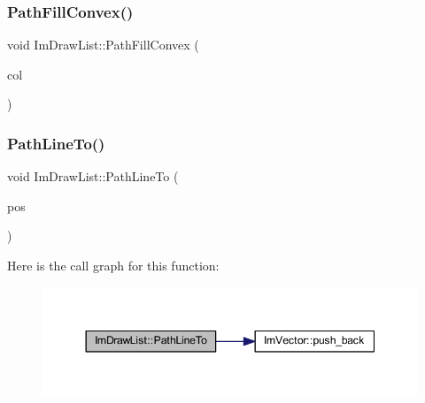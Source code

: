 \subsubsection{\texorpdfstring{Path\+Fill\+Convex()}{PathFillConvex()}}
{\footnotesize\ttfamily void Im\+Draw\+List\+::\+Path\+Fill\+Convex (\begin{DoxyParamCaption}\item[{\mbox{\hyperlink{imgui_8h_a118cff4eeb8d00e7d07ce3d6460eed36}{Im\+U32}}}]{col }\end{DoxyParamCaption})\hspace{0.3cm}{\ttfamily [inline]}}

\mbox{\label{struct_im_draw_list_a828d944325ed58d8b57abd3647bffaaf}} 
\subsubsection{\texorpdfstring{Path\+Line\+To()}{PathLineTo()}}
{\footnotesize\ttfamily void Im\+Draw\+List\+::\+Path\+Line\+To (\begin{DoxyParamCaption}\item[{const \mbox{\hyperlink{struct_im_vec2}{Im\+Vec2}} \&}]{pos }\end{DoxyParamCaption})\hspace{0.3cm}{\ttfamily [inline]}}

Here is the call graph for this function\+:
\nopagebreak
\begin{figure}[H]
\begin{center}
\leavevmode
\includegraphics[width=344pt]{struct_im_draw_list_a828d944325ed58d8b57abd3647bffaaf_cgraph}
\end{center}
\end{figure}
\mbox{\label{struct_im_draw_list_aa3dd11945fb62495f8b9e1392ed724e3}} 
